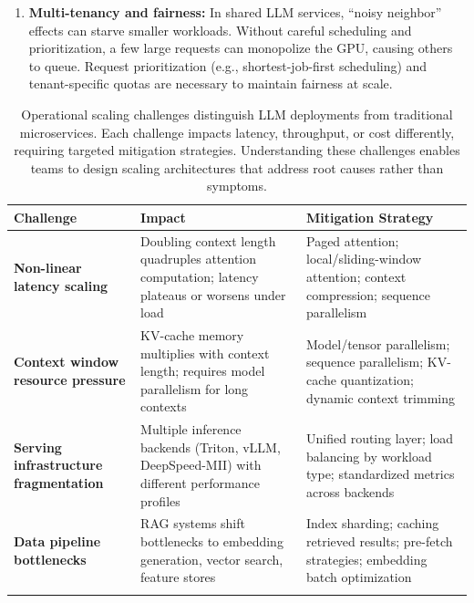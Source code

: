 \begin{enumerate}
    \item \textbf{Multi-tenancy and fairness:} In shared LLM services, ``noisy neighbor'' effects can starve smaller workloads. Without careful scheduling and prioritization, a few large requests can monopolize the GPU, causing others to queue. Request prioritization (e.g., shortest-job-first scheduling) and tenant-specific quotas are necessary to maintain fairness at scale.
\end{enumerate}

\begin{table}[t]
\centering
\small
\caption{Operational scaling challenges distinguish LLM deployments from traditional microservices. Each challenge impacts latency, throughput, or cost differently, requiring targeted mitigation strategies. Understanding these challenges enables teams to design scaling architectures that address root causes rather than symptoms.}
\label{tab:ch06_scaling_challenges}
\setlength{\tabcolsep}{6pt}
\renewcommand{\arraystretch}{1.3}
\begin{tabularx}{\linewidth}{@{}>{\raggedright\arraybackslash}p{3.5cm}>{\raggedright\arraybackslash}X>{\raggedright\arraybackslash}X@{}}
\toprule
\rowcolor{gray!15}
\textbf{Challenge} & \textbf{Impact} & \textbf{Mitigation Strategy} \\
\midrule
\textbf{Non-linear latency scaling} & Doubling context length quadruples attention computation; latency plateaus or worsens under load \cite{vaswani2017_attention} & Paged attention; local/sliding-window attention; context compression; sequence parallelism \\
\addlinespace[2pt]
\textbf{Context window resource pressure} & KV-cache memory multiplies with context length; requires model parallelism for long contexts \cite{vaswani2017_attention,vllm_pagedattention} & Model/tensor parallelism; sequence parallelism; KV-cache quantization; dynamic context trimming \\
\addlinespace[2pt]
\textbf{Serving infrastructure fragmentation} & Multiple inference backends (Triton, vLLM, DeepSpeed-MII) with different performance profiles & Unified routing layer; load balancing by workload type; standardized metrics across backends \\
\addlinespace[2pt]
\textbf{Data pipeline bottlenecks} & RAG systems shift bottlenecks to embedding generation, vector search, feature stores & Index sharding; caching retrieved results; pre-fetch strategies; embedding batch optimization \\
\addlinespace[2pt]

\end{tabularx}
\end{table}
